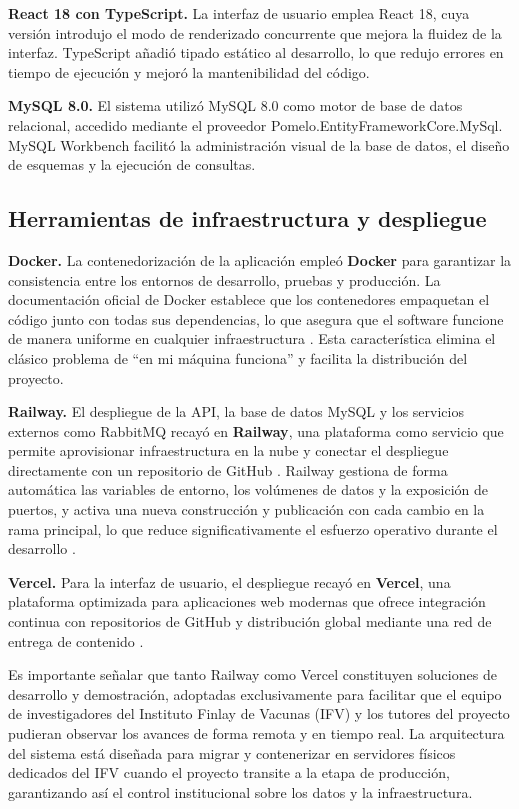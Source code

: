 \textbf{React 18 con TypeScript.} La interfaz de usuario emplea React 18, cuya versión introdujo el modo de renderizado concurrente que mejora la fluidez de la interfaz. 
TypeScript añadió tipado estático al desarrollo, lo que redujo errores en tiempo de ejecución y mejoró la mantenibilidad del código.

\textbf{MySQL 8.0.} El sistema utilizó MySQL 8.0 como motor de base de datos relacional, accedido mediante el proveedor Pomelo.EntityFrameworkCore.MySql. 
MySQL Workbench facilitó la administración visual de la base de datos, el diseño de esquemas y la ejecución de consultas.

\subsection{Herramientas de infraestructura y despliegue}

\textbf{Docker.} La contenedorización de la aplicación empleó \textbf{Docker} para garantizar la consistencia entre los entornos de desarrollo, pruebas y producción. La documentación oficial de Docker establece que los contenedores empaquetan el código junto con todas sus dependencias, lo que asegura que el software funcione de manera uniforme en cualquier infraestructura \cite{docker-overview}. Esta característica elimina el clásico problema de ``en mi máquina funciona'' y facilita la distribución del proyecto.

\textbf{Railway.} El despliegue de la API, la base de datos MySQL y los servicios externos como RabbitMQ recayó en \textbf{Railway}, una plataforma como servicio que permite aprovisionar infraestructura en la nube y conectar el despliegue directamente con un repositorio de GitHub \cite{railway-docs}. Railway gestiona de forma automática las variables de entorno, los volúmenes de datos y la exposición de puertos, y activa una nueva construcción y publicación con cada cambio en la rama principal, lo que reduce significativamente el esfuerzo operativo durante el desarrollo \cite{railway-deployments}.

\textbf{Vercel.} Para la interfaz de usuario, el despliegue recayó en \textbf{Vercel}, una plataforma optimizada para aplicaciones web modernas que ofrece integración continua con repositorios de GitHub y distribución global mediante una red de entrega de contenido \cite{vercel-docs}.

Es importante señalar que tanto Railway como Vercel constituyen soluciones de desarrollo y demostración, adoptadas exclusivamente para facilitar que el equipo de investigadores del Instituto Finlay de Vacunas (IFV) y los tutores del proyecto pudieran observar los avances de forma remota y en tiempo real. La arquitectura del sistema está diseñada para migrar y contenerizar en servidores físicos dedicados del IFV cuando el proyecto transite a la etapa de producción, garantizando así el control institucional sobre los datos y la infraestructura.

